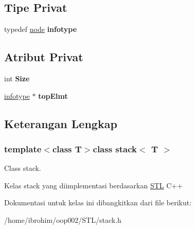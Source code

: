 \subsection*{Tipe Privat}
\begin{DoxyCompactItemize}
\item 
\hypertarget{classstack_aecfdf42bf6d98d24c3ef2d36d1544387}{}typedef \hyperlink{structstack_1_1node}{node} {\bfseries infotype}\label{classstack_aecfdf42bf6d98d24c3ef2d36d1544387}

\end{DoxyCompactItemize}
\subsection*{Atribut Privat}
\begin{DoxyCompactItemize}
\item 
\hypertarget{classstack_ac9f496894a810b4fa29ed97fc4f374b1}{}int {\bfseries Size}\label{classstack_ac9f496894a810b4fa29ed97fc4f374b1}

\item 
\hypertarget{classstack_abeda5790f5d12f0afacf91a1289ad2f8}{}\hyperlink{structstack_1_1node}{infotype} $\ast$ {\bfseries top\+Elmt}\label{classstack_abeda5790f5d12f0afacf91a1289ad2f8}

\end{DoxyCompactItemize}


\subsection{Keterangan Lengkap}
\subsubsection*{template$<$class T$>$class stack$<$ T $>$}

Class stack. 

Kelas stack yang diimplementasi berdasarkan \hyperlink{namespaceSTL}{S\+T\+L} C++ 

Dokumentasi untuk kelas ini dibangkitkan dari file berikut\+:\begin{DoxyCompactItemize}
\item 
/home/ibrohim/oop002/\+S\+T\+L/stack.\+h\end{DoxyCompactItemize}
